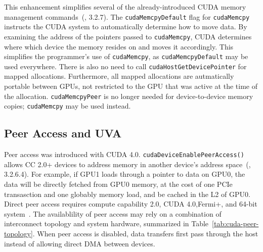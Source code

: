 This enhancement simplifies several of the already-introduced CUDA memory management commands~(\cite{nvidia2011cudac40}, 3.2.7).
The \texttt{cudaMemcpyDefault} flag for \texttt{cudaMemcpy} instructs the CUDA system to automatically determine how to move data.
By examining the address of the pointers passed to \texttt{cudaMemcpy}, CUDA determines where which device the memory resides on and moves it accordingly.
This simplifies the programmer's use of \texttt{cudaMemcpy}, as \texttt{cudaMemcpyDefault} may be used everywhere.
There is also no need to call \texttt{cudaHostGetDevicePointer} for mapped allocations.
Furthermore, all mapped allocations are autmatically portable between GPUs, not restricted to the GPU that was active at the time of the allocation.
\texttt{cudaMemcpyPeer} is no longer needed for device-to-device memory copies; \texttt{cudaMemcpy} may be used instead.

\subsection{Peer Access and UVA}
\label{sec:cuda-peer}



Peer access was introduced with CUDA 4.0.
\texttt{cudaDeviceEnablePeerAccess()} allows CC 2.0+ devices to address memory in another device's address space~(\cite{nvidia2011cudac40}, 3.2.6.4).
For example, if GPU1 loads through a pointer to data on GPU0, the data will be directly fetched from GPU0 memory, at the cost of one PCIe transasction and one globably memory load, and be cached in the L2 of GPU0.
Direct peer access requires compute capability 2.0, CUDA 4.0,Fermi+, and 64-bit system~\cite{schroeder2011peer}.
The availablility of peer access may rely on a combination of interconnect topology and system hardware, summarized in Table~\ref{tab:cuda-peer-topology}.
When peer access is disabled, data transfers first pass through the host instead of allowing direct DMA between devices.

